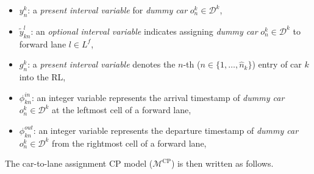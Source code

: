 \documentclass[12pt]{article}
\begin{document}
\begin{itemize}[leftmargin=0pt,itemsep=2pt,topsep=2pt]
    \item $y^k_n$: a \textit{present interval variable} for \textit{dummy car} $o^k_n\in \mathcal{D}^k$, %

    \item $\widetilde{y}^{l}_{kn}$: an \textit{optional interval variable} indicates assigning \textit{dummy car} $o^k_n\in \mathcal{D}^k$ to forward lane $l\in L^f$,


    \item $g^k_n$: a \textit{present interval variable} denotes the $n$-th ($n\in \{1,\dots,\widehat{n}_k\}$) entry of car $k$ into the RL,


    \item $\phi^{in}_{kn}$: an integer variable represents the arrival timestamp of \textit{dummy car} $o^k_n\in \mathcal{D}^k$ at the leftmost cell of a forward lane, %

    \item $\phi^{out}_{kn}$: an integer variable represents the departure timestamp of \textit{dummy car} $o^k_n\in \mathcal{D}^k$ from the rightmost cell of a forward lane, %
\end{itemize}

The car-to-lane assignment CP model ($\mathcal{M}^{\text{CP}}$) is then written as follows.


\vspace{-0.5cm}
\end{document}

